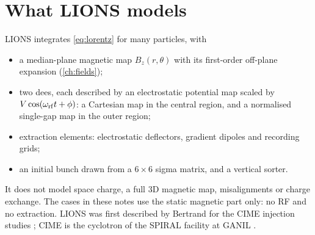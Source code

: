 \section{What LIONS models}
LIONS integrates \cref{eq:lorentz} for many particles, with
\begin{itemize}
\item a median-plane magnetic map $B_z(r,\theta)$ with its first-order off-plane expansion (\cref{ch:fields});
\item two dees, each described by an electrostatic potential map scaled by $V\cos(\omega_{\rm rf}t+\phi)$: a Cartesian map in the
central region, and a normalised single-gap map in the outer region;
\item extraction elements: electrostatic deflectors, gradient dipoles and recording grids;
\item an initial bunch drawn from a $6\times6$ sigma matrix, and a vertical sorter.
\end{itemize}
It does not model space charge, a full 3D magnetic map, misalignments or charge exchange.
The cases in these notes use the static magnetic part only: no RF and no extraction.
LIONS was first described by Bertrand for the CIME injection studies \cite{bertrand1995,bertrand1998}; CIME is the
cyclotron of the SPIRAL facility at GANIL \cite{bourgarel1998}.
